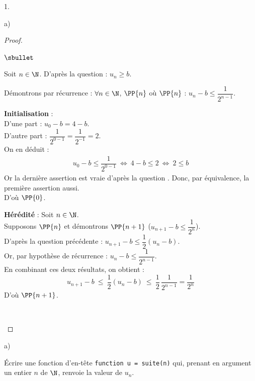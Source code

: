 \documentclass[11pt]{article}%
\begin{document}
\begin{noliste}{1.}
\begin{noliste}{a)}
    \begin{proof}~
      \begin{noliste}{$\sbullet$}
	\item Soit $n\in \N$. D'après la question  : $u_n \geq 
	b$.
	
	\item Démontrons par récurrence : $\forall n\in \N$, $\PP{n}$
	\quad où \quad $\PP{n}$ : $u_n -b \leq \dfrac{1}{2^{n-1}}$.
	\begin{noliste}{\fitem}
	  \item {\bf Initialisation} :\\
	  D'une part : $u_0-b = 4-b$.\\
	  D'autre part : $\dfrac{1}{2^{0-1}} = \dfrac{1}{2^{-1}} = 2$.\\
	  On en déduit :
	  \[
	    \begin{array}{rcl}
	      u_0 -b \leq \dfrac{1}{2^{0-1}} \ \Leftrightarrow \
	      4-b \leq 2 \ \Leftrightarrow \ 2 \leq b
	    \end{array}
	  \]
	  Or la dernière assertion est vraie d'après la question 
	  . Donc, par équivalence, la première assertion 
	  aussi.\\
	  D'où $\PP{0}$.
	  
	  \item {\bf Hérédité} : Soit $n\in\N$.\\
	  Supposons $\PP{n}$ et démontrons $\PP{n+1}$ (\ie $u_{n+1} 
	  -b \leq \dfrac{1}{2^n}$).\\
	  D'après la question précédente : $u_{n+1} -b \leq 
	  \dfrac{1}{2}(u_n -b)$.\\[.1cm]
	  Or, par hypothèse de récurrence : $u_n -b \leq 
	  \dfrac{1}{2^{n-1}}$.\\[.1cm]
	  En combinant ces deux résultats, on obtient :
	  \[
	    u_{n+1} -b \ \leq \ \dfrac{1}{2} (u_n -b) \ \leq \ 
	    \dfrac{1}{2}
	    \, \dfrac{1}{2^{n-1}} = \dfrac{1}{2^n}
	  \]
	  D'où $\PP{n+1}$.
	\end{noliste}
	~\\[-1.2cm]
      \end{noliste}
    \end{proof}
  \end{noliste}
  
  \item 
  \begin{noliste}{a)}
    \setlength{\itemsep}{2mm}
    \item Écrire une fonction \Scilab{} d'en-tête {\tt function u = 
    suite(n)} qui, prenant en argument un entier $n$ de $\N$, renvoie 
    la valeur de $u_n$.
    

\end{noliste}
\end{noliste}
\end{document}
